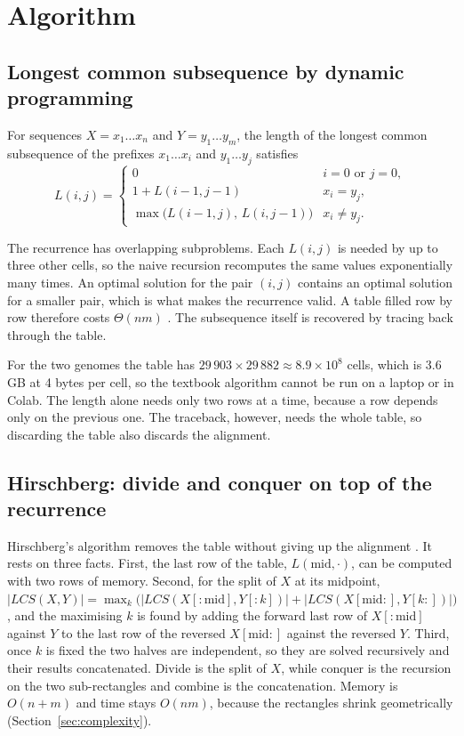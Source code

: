 \section{Algorithm}\label{sec:algorithm}

\subsection{Longest common subsequence by dynamic programming}

For sequences $X = x_1 \dots x_n$ and $Y = y_1 \dots y_m$, the length of the longest common subsequence of the prefixes $x_1 \dots x_i$ and $y_1 \dots y_j$ satisfies
\begin{equation}
    L(i, j) = \begin{cases}
        0 & i = 0 \text{ or } j = 0, \\
        1 + L(i - 1, j - 1) & x_i = y_j, \\
        \max\big(L(i - 1, j),\, L(i, j - 1)\big) & x_i \ne y_j.
    \end{cases}
    \label{eq:lcs}
\end{equation}


The recurrence has overlapping subproblems. Each $L(i, j)$ is needed by up
to three other cells, so the naive recursion recomputes the same values exponentially many times. An
optimal solution for the pair $(i, j)$ contains an optimal solution for a smaller pair, which is what
makes the recurrence valid. A table filled row by row therefore costs $\Theta(nm)$
\citep{clrs}. The subsequence itself is recovered by tracing back through the table.

For the two genomes the table has $29\,903 \times 29\,882 \approx 8.9 \times 10^8$ cells, which is
3.6 GB at 4 bytes per cell, so the textbook algorithm cannot be run on a laptop or in Colab. The
length alone needs only two rows at a time, because a row depends only on the previous one. The
traceback, however, needs the whole table, so discarding the table also discards the alignment.

\subsection{Hirschberg: divide and conquer on top of the recurrence}

Hirschberg's algorithm removes the table without giving up the alignment \citep{hirschberg1975}. It
rests on three facts. First, the last row of the table, $L(\text{mid}, \cdot)$, can be computed with
two rows of memory. Second, for the split of $X$ at its midpoint,
$|LCS(X, Y)| = \max_k \big( |LCS(X[:\text{mid}], Y[:k])| + |LCS(X[\text{mid}:], Y[k:])| \big)$, and
the maximising $k$ is found by adding the forward last row of $X[:\text{mid}]$ against $Y$ to the
last row of the reversed $X[\text{mid}:]$ against the reversed $Y$. Third, once $k$ is fixed the two
halves are independent, so they are solved recursively and their results concatenated. Divide is the
split of $X$, while conquer is the recursion on the two sub-rectangles and combine is the concatenation.
Memory is $O(n + m)$ and time stays $O(nm)$, because the rectangles shrink geometrically
(Section~\ref{sec:complexity}).

